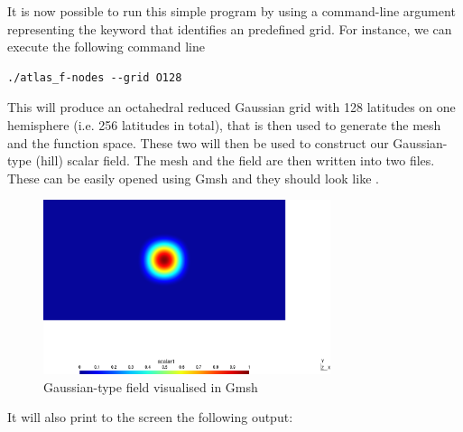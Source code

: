 %
It is now possible to run this simple program by using 
a command-line argument representing the keyword that 
identifies an \Atlas predefined grid.  For instance, 
we can execute the following command line
%
\begin{lstlisting}[style=BashStyle]
./atlas_f-nodes --grid O128
\end{lstlisting}
% 
This will produce an octahedral reduced Gaussian grid 
with 128 latitudes on one hemisphere (i.e. 256 latitudes 
in total), that is then used to generate the mesh and the 
 function space. These two will then be used 
to construct our Gaussian-type (hill) scalar field.
The mesh and the field are then written into two 
files. These can be easily opened using Gmsh and they should 
look like .
%
\begin{figure}%
\centering
\includegraphics[width=0.75\textwidth]{imgs/O128-field.png}
\caption{Gaussian-type field visualised in Gmsh}%
\label{fig:fs_nodes-F}%
\end{figure}
%
It will also print to the screen the following output:
%
